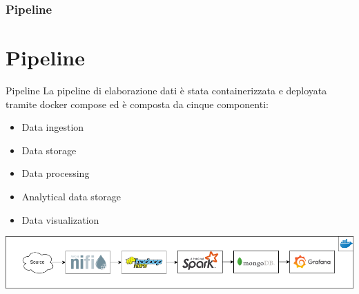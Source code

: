 \documentclass[13pt,aspectratio=169,t,xcolor=table]{beamer}
\begin{document}

\begin{frame}{}
    \frametitle{Pipeline}
\end{frame}

\section{Pipeline}
\begin{frame}{Pipeline}
    La pipeline di elaborazione dati è stata containerizzata e deployata tramite docker compose ed è composta da cinque componenti:
    \begin{itemize}
        \item Data ingestion
        \item Data storage
        \item Data processing
        \item Analytical data storage
        \item Data visualization
    \end{itemize}
    \begin{adjustbox}{margin=0.5cm 0cm 0cm 0.58cm, center} %
        \includegraphics[width=.99\textwidth]{res/pipeline.png}
    \end{adjustbox}
\end{frame}
\end{document}
